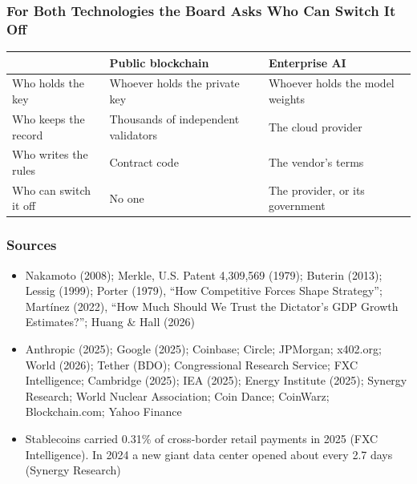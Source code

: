 \documentclass[aspectratio=169]{beamer}
\newcommand{\bi}{\begin{itemize}}
\newcommand{\ei}{\end{itemize}}
\newcommand{\m}{\item}
\begin{document}
\begin{frame}[label=appx-switchoff]
\frametitle{For Both Technologies the Board Asks Who Can Switch It Off}

\begin{center}
\begin{tabular}{p{} p{} p{}}
\toprule
 & \textbf{Public blockchain} & \textbf{Enterprise AI} \\
\midrule
Who holds the key & Whoever holds the private key & Whoever holds the model weights \\
Who keeps the record & Thousands of independent validators & The cloud provider \\
Who writes the rules & Contract code & The vendor's terms \\
Who can switch it off & No one & The provider, or its government \\
\bottomrule
\end{tabular}
\end{center}

\par\vspace{0pt plus 1fill}\hfill{\scriptsize \hyperlink{main-northstar}{}}
\end{frame}

\begin{frame}[label=appx-sources]
\frametitle{Sources}

\small
\bi
\m Nakamoto (2008); Merkle, U.S. Patent 4,309,569 (1979); Buterin (2013); Lessig (1999); Porter (1979), ``How Competitive Forces Shape Strategy''; Mart\'{i}nez (2022), ``How Much Should We Trust the Dictator's GDP Growth Estimates?''; Huang \& Hall (2026)
\m Anthropic (2025); Google (2025); Coinbase; Circle; JPMorgan; x402.org; World (2026); Tether (BDO); Congressional Research Service; FXC Intelligence; Cambridge (2025); IEA (2025); Energy Institute (2025); Synergy Research; World Nuclear Association; Coin Dance; CoinWarz; Blockchain.com; Yahoo Finance
\m Stablecoins carried 0.31\% of cross-border retail payments in 2025 (FXC Intelligence). In 2024 a new giant data center opened about every 2.7 days (Synergy Research)
\ei
\par\vspace{0pt plus 1fill}\hfill{\scriptsize \hyperlink{main-credits}{}}
\end{frame}
\end{document}
